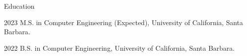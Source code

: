 \begin{vitae}

\begin{vitaesection}{Education}
\vspace{-0.1cm}
\item [2023]	M.S. in Computer Engineering (Expected), University of California, Santa Barbara.
\item [2022]	B.S. in Computer Engineering, University of California, Santa Barbara.
\end{vitaesection}

\end{vitae}
